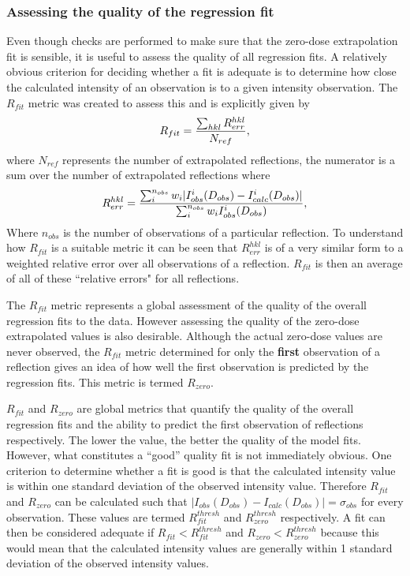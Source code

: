 \subsubsection{Assessing the quality of the regression fit}
\label{subs:Assessing the quality of the regression fit}
Even though checks are performed to make sure that the zero-dose extrapolation fit is sensible, it is useful to assess the quality of all regression fits.
A relatively obvious criterion for deciding whether a fit is adequate is to determine how close the calculated intensity of an observation is to a given intensity observation.
The $R_{fit}$ metric was created to assess this and is explicitly given by
\begin{equation}
    R_{fit} = \frac{\sum_{hkl} R^{hkl}_{err}}{N_{ref}},
    \label{eq:R_fit equation - Extrapolation method}
\end{equation}
where $N_{ref}$ represents the number of extrapolated reflections, the numerator is a sum over the number of extrapolated reflections where
\begin{equation}
    R^{hkl}_{err} = \frac{\sum_i^{n_{obs}} w_i |I^i_{obs}(D_{obs}) - I^i_{calc}(D_{obs})|}{\sum_i^{n_{obs}} w_i I^i_{obs}(D_{obs})},
\end{equation}
Where $n_{obs}$ is the number of observations of a particular reflection.
To understand how $R_{fit}$ is a suitable metric it can be seen that $R^{hkl}_{err}$ is of a very similar form to a weighted relative error over all observations of a reflection.
$R_{fit}$ is then an average of all of these ``relative errors" for all reflections.

The $R_{fit}$ metric represents a global assessment of the quality of the overall regression fits to the data.
However assessing the quality of the zero-dose extrapolated values is also desirable.
Although the actual zero-dose values are never observed, the $R_{fit}$ metric determined for only the \textbf{first} observation of a reflection gives an idea of how well the first observation is predicted by the regression fits.
This metric is termed $R_{zero}$.

$R_{fit}$ and $R_{zero}$ are global metrics that quantify the quality of the overall regression fits and the ability to predict the first observation of reflections respectively.
The lower the value, the better the quality of the model fits.
However, what constitutes a ``good'' quality fit is not immediately obvious.
One criterion to determine whether a fit is good is that the calculated intensity value is within one standard deviation of the observed intensity value.
Therefore $R_{fit}$ and $R_{zero}$ can be calculated such that $|I_{obs}(D_{obs}) - I_{calc}(D_{obs})| = \sigma_{obs}$ for every observation.
These values are termed $R^{thresh}_{fit}$ and $R^{thresh}_{zero}$ respectively.
A fit can then be considered adequate if $R_{fit} < R^{thresh}_{fit}$ and $R_{zero} < R^{thresh}_{zero}$ because this would mean that the calculated intensity values are generally within 1 standard deviation of the observed intensity values.


